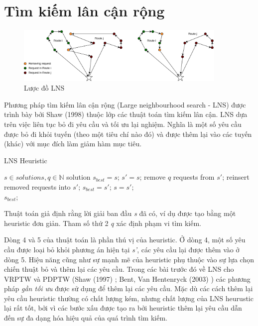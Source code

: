 \section{Tìm kiếm lân cận rộng}

\begin{figure}[H] %
  \centering %
  \includegraphics[width=0.9\textwidth]{figures/ALNS-paradim.png} 
  \caption{Lược đồ LNS} 
  \label{fig:lns_paradim}
\end{figure}

Phương pháp tìm kiếm lân cận rộng (Large neighbourhood search - LNS) được trình bày bởi Shaw (1998) \cite{shaw1998using} thuộc lớp các thuật toán tìm kiếm lân cận. LNS dựa trên việc liên tục bỏ đi yêu cầu và tối ưu lại nghiệm. Nghĩa là một số yêu cầu được bỏ đi khỏi tuyến (theo một tiêu chí nào đó) và được thêm lại vào các tuyến (khác) với mục đích làm giảm hàm mục tiêu.

\begin{algorithm}
  \label{alg:lns}
	\caption{LNS Heuristic} 
	\begin{algorithmic}[1]
        \Require $s \in {solutions}, q \in \mathbb{N}$
        \State solution $s_{best} = s$;
				\Repeat
					\State $s'=s$;
					\State remove $q$ requests from $s'$;
					\State reinsert removed requests into $s'$;
						\State $s_{best} = s'$;
					\EndIf
						\State $s=s'$;
					\EndIf
				\\
				\Return $s_{best}$;
	\end{algorithmic} 
\end{algorithm}

Thuật toán giả định rằng lời giải ban đầu \textit{s} đã có, ví dụ được tạo bằng một heuristic đơn giản. Tham số thứ 2 \textit{q} xác định phạm vi tìm kiếm. 

Dòng 4 và 5 của thuật toán là phần thú vị của heuristic. Ở dòng 4, một số yêu cầu được loại bỏ khỏi phương án hiện tại \textit{s'}, các yêu cầu lại được thêm vào ở dòng 5. Hiệu năng cũng như sự mạnh mẽ của heuristic phụ thuộc vào sự lựa chọn chiến thuật bỏ và thêm lại các yêu cầu. Trong các bài trước đó về LNS cho VRPTW và PDPTW (Shaw (1997) \cite{shaw1997new}; Bent, Van Hentenryck (2003) \cite{bent2003two}) các phương pháp \textit{gần tối ưu} được sử dụng để thêm lại các yêu cầu. Mặc dù các cách thêm lại yêu cầu heuristic thường có chất lượng kém, nhưng chất lượng của LNS heurustic lại rất tốt, bởi vì các bước xấu được tạo ra bởi heuristic thêm lại yêu cầu dẫn đến sự đa dạng hóa hiệu quả của quá trình tìm kiếm. 

